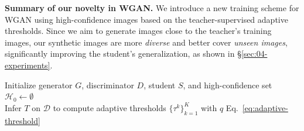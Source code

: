\begin{foldable}
  \textbf{Summary of our novelty in WGAN.}
  We introduce a new training scheme for WGAN using high-confidence images based on the teacher-supervised adaptive thresholds.
  Since we aim to generate images close to the teacher's training images, our synthetic images are more \textit{diverse} and better cover \textit{unseen images}, significantly improving the student's generalization, as shown in \S\ref{sec:04-experiments}.
\end{foldable}

\begin{algorithm}[ht]

  \caption{Proposed method \textbf{DivBFKD}}
  \label{alg:algorithm-divbfkd}


  \vspace{-0.5\baselineskip}
  \Comment{\noindent\hrulefill}

  \vspace{0.5\baselineskip}
  Initialize generator $G$, discriminator $D$, student $S$, and high-confidence set $\mathcal{H}_0 \leftarrow \emptyset$ \\
  Infer $T$ on $\mathcal{D}$ to compute adaptive thresholds $\{\tau^k\}_{k=1}^K$ with $q$ \hfill Eq.~\ref{eq:adaptive-threshold} \\


\end{algorithm}
